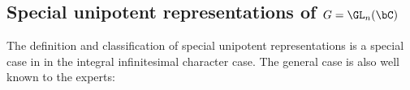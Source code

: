 \documentclass[12pt,a4paper]{amsart}
\numberwithin{equation}{section}
\newtheorem{defn}[thm]{Definition}
\theoremstyle{remark}
\def\fggR{\fgg_\bR}
\def\ckG{\check{G}}
\def\dBV{d_{\mathrm{BV}}}
\def\YD{\mathsf{YD}}
\def\lamck{\lambda_\ckcO}
\def\AND{\quad \text{and} \quad}
\def\Spr{\mathrm{Springer}}
\begin{document}











\subsection{Special unipotent representations of $G = \GL_n(\bC)$}
\def\lamckC{\lambda^\bC_{\ckcO}}
\def\fggR{\fgg_{\bR}}
\def\fggC{\fgg_{\bC}}
\def\cIck{\cI_{\ckcO}}
\def\WC{W^{\bC}}

The definition and classification of special unipotent representations
is a special case in \cite{BVUni} in the integral infinitesimal character case.
The general case is also well known to the experts:%
\end{document}
